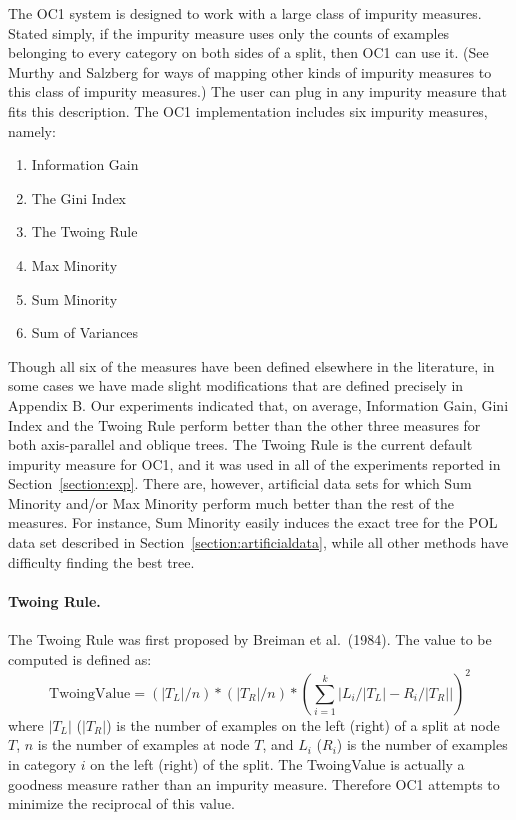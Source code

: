 The OC1 system is designed to work with a large class of impurity
measures.  Stated simply, if the impurity measure uses only the counts
of examples belonging to every category on both sides of a split, then
OC1 can use it.  (See Murthy and Salzberg
\citeyear{murthy/salzberg/94} for ways of mapping other kinds of
impurity measures to this class of impurity measures.)  The user can
plug in any impurity measure that fits this description.  The OC1
implementation includes six impurity measures, namely:
\begin{enumerate}
\itemsep -0.1in
\item Information Gain
\item The Gini Index
\item The Twoing Rule
\item Max Minority
\item Sum Minority
\item Sum of Variances
\end{enumerate}  
Though all six of the measures have been defined elsewhere in the
literature, in some cases we have made slight modifications that are
defined precisely in Appendix B\@.  Our experiments
indicated that, on average, Information Gain, Gini Index and the
Twoing Rule perform better than the other three measures for both
axis-parallel and oblique trees.  The Twoing Rule is the current
default impurity measure for OC1, and it was used in all of the
experiments reported in Section~\ref{section:exp}.  There are,
however, artificial data sets for which Sum Minority and/or Max
Minority perform much better than the rest of the measures.  For
instance, Sum Minority easily induces the exact tree for the POL data
set described in Section~\ref{section:artificialdata}, while all other
methods have difficulty finding the best tree.

\paragraph{Twoing Rule.}
The Twoing Rule was first proposed by Breiman et al.\ (1984).  The
value to be computed is defined as:
\[ \mbox{TwoingValue} = (|T_L|/n) * (|T_R|/n) * 
          (\sum_{i=1}^{k} {\left| L_i/|T_L| - R_i/|T_R| \right|})^2 \]
where $|T_L|$ ($|T_R|$) is the number of examples on the left (right)
of a split at node $T$, $n$ is the number of examples at node $T$, and
$L_i$ ($R_i$) is the number of examples in category $i$ on the left
(right) of the split.  The TwoingValue is actually a goodness measure
rather than an impurity measure.  Therefore OC1 attempts to minimize
the reciprocal of this value.

